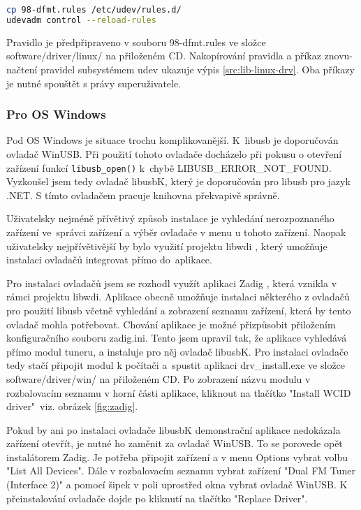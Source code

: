 \begin{lstlisting}[language=bash, label=src:lib-linux-drv, caption=Přídání udev pravidla.]
cp 98-dfmt.rules /etc/udev/rules.d/
udevadm control --reload-rules
\end{lstlisting}

Pravidlo je předpřipraveno v souboru 98-dfmt.rules ve složce software/driver/linux/ na přiloženém CD. Nakopírování pravidla a příkaz znovu-načtení pravidel subsystémem udev ukazuje výpis \ref{src:lib-linux-drv}. Oba příkazy je nutné spouštět s právy superuživatele.

\subsubsection{Pro OS Windows}
Pod OS Windows je situace trochu komplikovanější. K~libusb je doporučován ovladač WinUSB. Při použití tohoto ovladače docházelo při pokusu o otevření zařízení funkcí \verb|libusb_open()| k~chybě LIBUSB\_ERROR\_NOT\_FOUND. Vyzkoušel jsem tedy ovladač libusbK, který je doporučován pro libusb pro jazyk .NET. S tímto ovladačem pracuje knihovna překvapivě správně.

Uživatelsky nejméně přívětivý způsob instalace je vyhledání nerozpoznaného zařízení ve~správci zařízení a výběr ovladače v menu u tohoto zařízení. Naopak uživatelsky nejpřívětivější by bylo využití projektu libwdi \cite{libwdi}, který umožňuje instalaci ovladačů integrovat přímo do~aplikace.


Pro instalaci ovladačů jsem se rozhodl využít aplikaci Zadig \cite{zadig}, která vznikla v rámci projektu libwdi. Aplikace obecně umožňuje instalaci některého z ovladačů pro použití libusb včetně vyhledání a zobrazení seznamu zařízení, která by tento ovladač mohla potřebovat. Chování aplikace je možné přizpůsobit přiložením konfiguračního souboru zadig.ini. Tento jsem upravil tak, že aplikace vyhledává přímo modul tuneru, a instaluje pro něj ovladač libusbK. Pro instalaci ovladače tedy stačí připojit modul k počítači a~spustit aplikaci drv\_install.exe ve složce software/driver/win/ na přiloženém CD. Po zobrazení názvu modulu v rozbalovacím seznamu v horní části aplikace, kliknout na tlačítko "Install WCID driver"~viz. obrázek \ref{fig:zadig}.

Pokud by ani po instalaci ovladače libusbK demonstrační aplikace nedokázala zařízení otevřít, je nutné ho zaměnit za ovladač WinUSB. To se porovede opět instalátorem Zadig. Je potřeba připojit zařízení a v menu Options vybrat volbu "List All Devices". Dále v rozbalovacím seznamu vybrat zařízení "Dual FM Tuner (Interface 2)" a pomocí šipek v poli uprostřed okna vybrat ovladač WinUSB. K přeinstalování ovladače dojde po kliknutí na tlačítko "Replace Driver".

